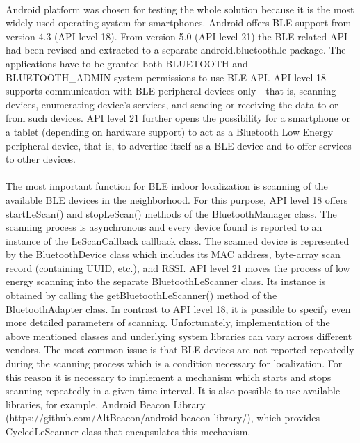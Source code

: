 \documentclass[a4paper,12pt]{report}
\begin{document}
\paragraph{}Android platform was chosen for testing the whole solution because it is the most widely used operating system for smartphones. Android offers BLE support from version 4.3 (API level 18). From version 5.0 (API level 21) the BLE-related API had been revised and extracted to a separate android.bluetooth.le package. The applications have to be granted both BLUETOOTH and BLUETOOTH\_ADMIN system permissions to use BLE API. API level 18 supports communication with BLE peripheral devices only—that is, scanning devices, enumerating device’s services, and sending or receiving the data to or from such devices. API level 21 further opens the possibility for a smartphone or a tablet (depending on hardware support) to act as a Bluetooth Low Energy peripheral device, that is, to advertise itself as a BLE device and to offer services to other devices.
\paragraph{}The most important function for BLE indoor localization is scanning of the available BLE devices in the neighborhood. For this purpose, API level 18 offers startLeScan() and stopLeScan() methods of the BluetoothManager class. The scanning process is asynchronous and every device found is reported to an instance of the LeScanCallback callback class. The scanned device is represented by the BluetoothDevice class which includes its MAC address, byte-array scan record (containing UUID, etc.), and RSSI. API level 21 moves the process of low energy scanning into the separate BluetoothLeScanner class. Its instance is obtained by calling the getBluetoothLeScanner() method of the BluetoothAdapter class. In contrast to API level 18, it is possible to specify even more detailed parameters of scanning. Unfortunately, implementation of the above mentioned classes and underlying system libraries can vary across different vendors. The most common issue is that BLE devices are not reported repeatedly during the scanning process which is a condition necessary for localization. For this reason it is necessary to implement a mechanism which starts and stops scanning repeatedly in a given time interval. It is also possible to use available libraries, for example, Android Beacon Library (https://github.com/AltBeacon/android-beacon-library/), which provides CycledLeScanner class that encapsulates this mechanism.
\newpage
\end{document}
